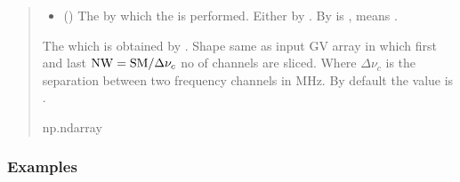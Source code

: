 \documentclass[a4paper,11pt,oneside,english,openany]{sphinxmanual}
\begin{document}
\begin{fulllineitems}
\begin{quote}
\begin{description}
\begin{itemize}
\item {} 
\sphinxAtStartPar
{} (\sphinxstyleliteralemphasis{\sphinxupquote{,}}\sphinxstyleliteralemphasis{\sphinxupquote{,}}\sphinxstyleliteralemphasis{\sphinxupquote{, }}) \textendash{} The  by which the  is performed. Either by . By  is , means .

\end{itemize}

\sphinxAtStartPar
{} \textendash{} The  which is obtained by . Shape same as input GV array  in which first and last \({\rm NW} = {\rm SM}/{\Delta\nu_c}\) no of channels are sliced. Where \(\Delta\nu_c\) is the separation between two frequency channels in MHz. By default the value is .

\sphinxAtStartPar
np.ndarray

\end{description}\end{quote}
\subsubsection*{Examples}


\end{fulllineitems}
\end{document}
